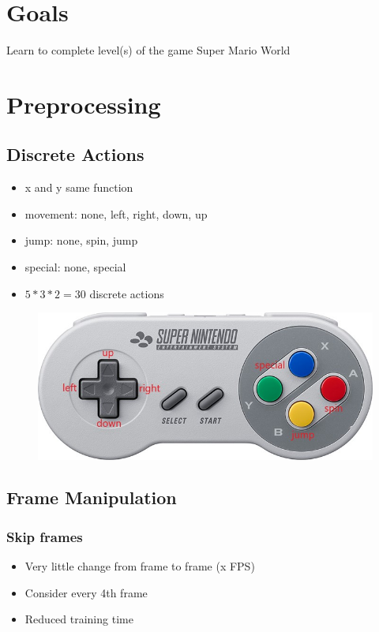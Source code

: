 \documentclass{article}
\begin{document}
    \section{Goals}
    Learn to complete level(s) of the game Super Mario World

    \section{Preprocessing}
    \subsection{Discrete Actions}
    \begin{itemize}
        \item x and y same function
        \item movement: none, left, right, down, up
        \item jump: none, spin, jump
        \item special: none, special
        \item $5*3*2=30$ discrete actions
    \end{itemize}
    \begin{figure}[H]
        \centering
        \includegraphics[width=.85\textwidth]{snes-controller-annot}
    \end{figure}
    \subsection{Frame Manipulation}
    \subsubsection*{Skip frames}
    \begin{itemize}
        \item Very little change from frame to frame (x FPS)
        \item Consider every 4th frame
        \item Reduced training time
    \end{itemize}
\end{document}
